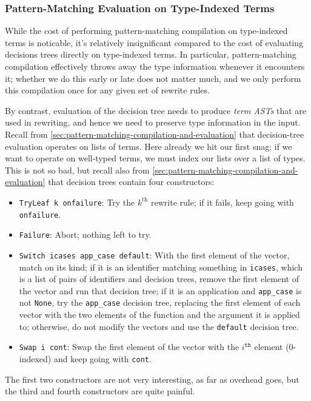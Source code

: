 \subsubsection{Pattern-Matching Evaluation on Type-Indexed Terms}
While the cost of performing pattern-matching compilation on type-indexed terms is noticable, it's relatively insignificant compared to the cost of evaluating decisions trees directly on type-indexed terms.
In particular, pattern-matching compilation effectively throws away the type information whenever it encounters it; whether we do this early or late does not matter much, and we only perform this compilation once for any given set of rewrite rules.

By contrast, evaluation of the decision tree needs to produce \emph{term ASTs} that are used in rewriting, and hence we need to preserve type information in the input.
Recall from \autoref{sec:pattern-matching-compilation-and-evaluation} that decision-tree evaluation operates on lists of terms.
Here already we hit our first snag: if we want to operate on well-typed terms, we must index our lists over a list of types.
This is not so bad, but recall also from \autoref{sec:pattern-matching-compilation-and-evaluation} that decision trees contain four constructors:
\begin{itemize}
  \item \texttt{TryLeaf k onfailure}: Try the $k^\text{th}$ rewrite rule; if it fails, keep going with \texttt{onfailure}.
  \item \texttt{Failure}: Abort; nothing left to try.
  \item \texttt{Switch icases app\_case default}:
    With the first element of the vector, match on its kind; if it is an identifier matching something in \texttt{icases}, which is a list of pairs of identifiers and decision trees, remove the first element of the vector and run that decision tree; if it is an application and \texttt{app\_case} is not \texttt{None}, try the \texttt{app\_case} decision tree, replacing the first element of each vector with the two elements of the function and the argument it is applied to; otherwise, do not modify the vectors and use the \texttt{default} decision tree.
  \item \texttt{Swap i cont}: Swap the first element of the vector with the $i^\texttt{th}$ element (0-indexed) and keep going with \texttt{cont}.
\end{itemize}
The first two constructors are not very interesting, as far as overhead goes, but the third and fourth constructors are quite painful.


